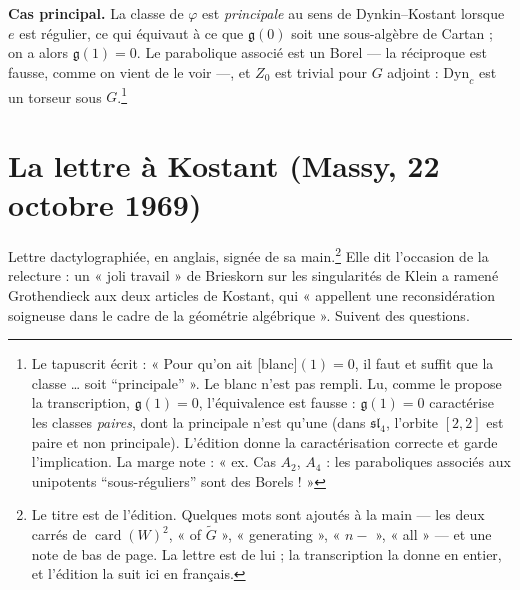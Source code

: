 \documentclass[11pt,a4paper]{article}
\begin{document}
\textbf{Cas principal.} La classe de $\varphi$ est \emph{principale} au sens de
Dynkin--Kostant lorsque $e$ est régulier, ce qui équivaut à ce que
$\mathfrak{g}(0)$ soit une sous-algèbre de Cartan ; on a alors
$\mathfrak{g}(1)=0$. Le parabolique associé est un Borel — la réciproque est
fausse, comme on vient de le voir —, et $Z_{0}$ est trivial pour $G$ adjoint :
$\mathrm{Dyn}_{c}$ est un torseur sous $G$.\footnote{Le tapuscrit écrit :
« Pour qu'on ait [blanc]$(1)=0$, il faut et suffit que la classe … soit
“principale” ». Le blanc n'est pas rempli. Lu, comme le propose la
transcription, $\mathfrak{g}(1)=0$, l'équivalence est fausse : $\mathfrak{g}(1)=0$
caractérise les classes \emph{paires}, dont la principale n'est qu'une (dans
$\mathfrak{sl}_{4}$, l'orbite $[2,2]$ est paire et non principale).
L'édition donne la caractérisation correcte et garde l'implication. La marge
note : « ex. Cas $A_{2}$, $A_{4}$ : les paraboliques associés aux unipotents
“sous-réguliers” sont des Borels ! »}

\section*{La lettre à Kostant (Massy, 22 octobre 1969)}

Lettre dactylographiée, en anglais, signée de sa main.\footnote{Le titre est de
l'édition. Quelques mots sont ajoutés à la main — les deux carrés de
$\operatorname{card}(W)^{2}$, « of $\widetilde{G}$ », « generating », « $n-$ »,
« all » — et une note de bas de page. La lettre est de lui ; la transcription
la donne en entier, et l'édition la suit ici en français.} Elle dit l'occasion
de la relecture : un « joli travail » de Brieskorn sur les singularités de
Klein a ramené Grothendieck aux deux articles de Kostant, qui « appellent une
reconsidération soigneuse dans le cadre de la géométrie algébrique ». Suivent
des questions.
\end{document}
